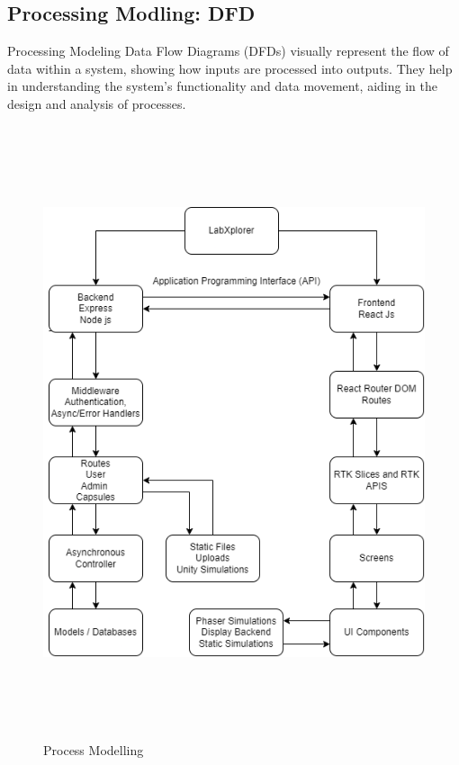 \subsection{Processing Modling: DFD}
Processing Modeling Data Flow Diagrams (DFDs) visually represent the flow of data within a system, showing how inputs are processed into outputs. They help in understanding the system's functionality and data movement, aiding in the design and analysis of processes.
\begin{figure}[H]
    \centering
    \includegraphics[height = 18cm]{Diagrams/DFD Process Modeling.png}
    \caption{Process Modelling}
\end{figure}
\newpage

